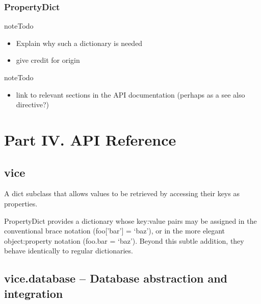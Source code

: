 \documentclass[letterpaper,10pt,english]{sphinxmanual}
\begin{document}
\subsubsection{PropertyDict}
\label{developer_guide/architecture:propertydict}
\begin{notice}{note}{Todo}
\begin{itemize}
\item {} 
Explain why such a dictionary is needed

\item {} 
give credit for origin

\end{itemize}
\end{notice}

\begin{notice}{note}{Todo}
\begin{itemize}
\item {} 
link to relevant sections in the API documentation (perhaps as a
see also directive?)

\end{itemize}
\end{notice}


\section{Part IV. API Reference}
\label{api_reference:part-iv-api-reference}\label{api_reference::doc}

\subsection{vice}
\label{api_reference:vice}

\begin{fulllineitems}
\label{api_reference:vice.PropertyDict}
A dict subclass that allows values to be retrieved by accessing their
keys as properties.

PropertyDict provides a dictionary whose key:value pairs may be
assigned in the conventional brace notation (foo{[}'bar'{]} = `baz'),
or in the more elegant object:property notation (foo.bar = `baz').
Beyond this subtle addition, they behave identically to regular
dictionaries.

\end{fulllineitems}



\subsection{vice.database -- Database abstraction and integration}
\label{api_reference:vice-database-database-abstraction-and-integration}\label{api_reference:module-vice.database}
\end{document}
